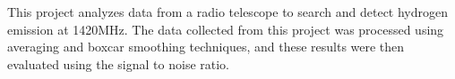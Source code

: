 This project analyzes  data from a radio telescope to search and detect hydrogen emission at 1420MHz. 
The data collected from this project was processed using averaging and boxcar smoothing techniques, and these results were then evaluated using the signal to noise ratio.

